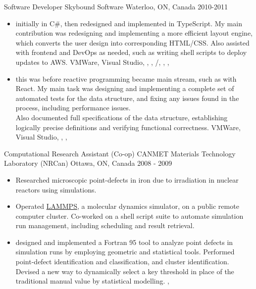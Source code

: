 \cventry
  {Software Developer} %
  {Skybound Software} %
  {Waterloo, ON, Canada} %
  {2010-2011} %
  {
    \begin{itemize} %
      \liststyle
      \item{ initially in C\#, then redesigned and implemented in TypeScript. 
      My main contribution was redesigning and implementing a more efficient layout engine, which converts the user design into corresponding HTML/CSS.
      Also assisted with frontend and DevOps as needed, such as writing shell scripts to deploy updates to AWS.
      \tgskills VMWare, Visual Studio, \rfcsharp, \rftypescript, \rfhtml/\rfcss, \rfmercurial, \rfbash, \rfaws
      }

      \item{
      this was before reactive programming became main stream, such as with React.
      My main task was designing and implementing a complete set of automated tests for the data structure, and fixing any issues found in the process, including performance issues. \\
      Also documented full specifications of the data structure, establishing logically precise definitions and verifying functional correctness.
      \tgskills VMWare, Visual Studio, \rfcsharp, \rflatex, \rfmercurial

      }
    \end{itemize}
  }

\cventry
  {Computational Research Assistant (Co-op)} %
  {CANMET Materials Technology Laboratory (NRCan)} %
  {Ottawa, ON, Canada} %
  {2008 - 2009} %
  {
    \begin{itemize} %
      \liststyle
      \item{
        Researched microscopic point-defects in iron due to irradiation in nuclear reactors using simulations.}
      \item{Operated \href{https://www.lammps.org/}{LAMMPS}, a molecular dynamics simulator, on a public remote computer cluster. 
        Co-worked on a shell script suite to automate simulation run management, including scheduling and result retrieval.
      }
    \item{
       designed and implemented a Fortran 95 tool to analyze point defects in simulation runs by employing geometric and statistical tools. 
      Performed point-defect identification and classification, and cluster identification.
      Devised a new way to dynamically select a key threshold in place of the traditional manual value by statistical modelling.
\tgskills \rffortran, \rfclang
    }
    \end{itemize}
  }



